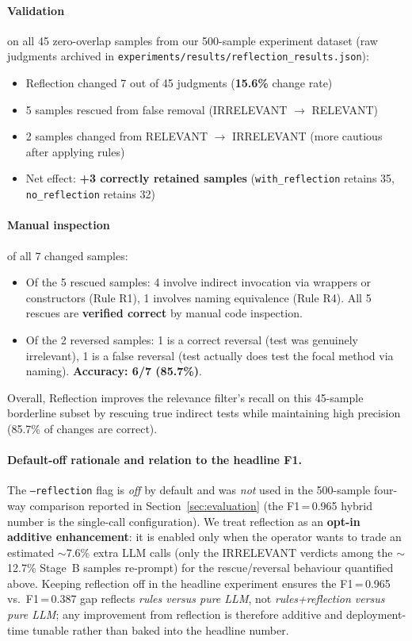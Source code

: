 \documentclass[acmlarge,nonacm,screen]{acmart}
\begin{document}
\paragraph{Validation} on all 45 zero-overlap samples from our
500-sample experiment dataset (raw judgments archived in
\texttt{experiments/\allowbreak results/\allowbreak reflection\_results.json}):
\begin{itemize}
    \item Reflection changed 7 out of 45 judgments (\textbf{15.6\%} change rate)
    \item 5 samples rescued from false removal (IRRELEVANT $\to$ RELEVANT)
    \item 2 samples changed from RELEVANT $\to$ IRRELEVANT (more cautious after applying rules)
    \item Net effect: \textbf{+3 correctly retained samples} (\texttt{with\_reflection} retains 35, \texttt{no\_reflection} retains 32)
\end{itemize}

\paragraph{Manual inspection} of all 7 changed samples:
\begin{itemize}
    \item Of the 5 rescued samples: 4 involve indirect invocation via wrappers or constructors (Rule R1), 1 involves naming equivalence (Rule R4). All 5 rescues are \textbf{verified correct} by manual code inspection.
    \item Of the 2 reversed samples: 1 is a correct reversal (test was genuinely irrelevant), 1 is a false reversal (test actually does test the focal method via naming). \textbf{Accuracy: 6/7 (85.7\%)}.
\end{itemize}

Overall, Reflection improves the relevance filter's recall on this
45-sample borderline subset by rescuing true indirect tests while
maintaining high precision (85.7\% of changes are correct).

\paragraph{Default-off rationale and relation to the headline F1.}
The \texttt{--reflection} flag is \emph{off} by default and was
\emph{not} used in the 500-sample four-way comparison reported in
Section~\ref{sec:evaluation} (the F1\,=\,0.965 hybrid number is the
single-call configuration). We treat reflection as an
\textbf{opt-in additive enhancement}: it is enabled only when the
operator wants to trade an estimated $\sim$7.6\% extra LLM calls
(only the IRRELEVANT verdicts among the $\sim$12.7\% Stage~B
samples re-prompt) for the rescue/reversal behaviour quantified
above. Keeping reflection off in the headline experiment ensures
the F1\,=\,0.965 vs.\ F1\,=\,0.387 gap reflects \emph{rules versus
pure LLM}, not \emph{rules+reflection versus pure LLM}; any
improvement from reflection is therefore additive and
deployment-time tunable rather than baked into the headline number.
\end{document}
